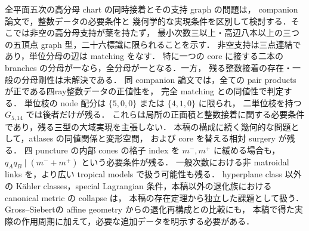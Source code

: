 全平面五次の高分母 chart の同時接着とその支持 graph の問題は，
companion 論文\cite{QuinticArithmetic}で，整数データの必要条件と
幾何学的な実現条件を区別して検討する．そこでは非空の高分母支持が葉を持たず，
最小次数三以上・高辺八本以上の三つの五頂点 graph 型，二十六標識に限られることを示す．
非空支持は三点連結であり，単位分母の辺は matching をなす．
特に一つの core に接する二本の branches の分母が一なら，全分母が一となる．一方，
残る整数接着の存在・一般の分母剛性は未解決である．
同 companion 論文では，全ての pair products が正である四ray整数データの正値性を，
完全 matching との同値性で判定する．
単位枝の node 配分は $\{5,0,0\}$ または $\{4,1,0\}$ に限られ，
二単位枝を持つ $G_{5,14}$ では後者だけが残る．
これらは局所の正面積と整数接着に関する必要条件であり，残る三型の大域実現を主張しない．
本稿の構成に続く幾何的な問題として，atlases の同値関係と変形空間，
および core を替える相対 surgery が残る．
四 puncture の内部 cones の格子 index を $m^-,m^+$ に緩める場合も，
$q_Aq_B\mid(m^-+m^+)$ という必要条件が残る．
一般次数における非 matroidal links を，より広い tropical models で扱う可能性も残る．
hyperplane class 以外の Kähler classes，special Lagrangian 条件，本稿以外の退化族における canonical metric の collapse は，
本稿の存在定理から独立した課題として扱う．
Gross--Siebert\cite{GrossSiebert}の affine geometry からの退化再構成との比較にも，
本稿で得た実際の作用周期に加えて，必要な追加データを明示する必要がある．
